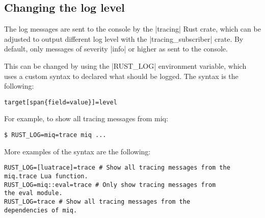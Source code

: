 \subsection{Changing the log level}

The log messages are sent to the console by the |tracing|
Rust crate, which can be adjusted to output different log
level with the |tracing_subscriber| crate. By default, only messages of severity |info| or
higher as sent to the console.

This can be changed by using the |RUST_LOG| environment
variable, which uses a custom syntax to declared what should
be logged. The syntax is the following:

\begin{verbatim}
target[span{field=value}]=level
\end{verbatim}

For example, to show all tracing messages from miq:

\begin{verbatim}
$ RUST_LOG=miq=trace miq ...
\end{verbatim}

More examples of the syntax are the following:

\begin{verbatim}
RUST_LOG=[luatrace]=trace # Show all tracing messages from the miq.trace Lua function.
RUST_LOG=miq::eval=trace # Only show tracing messages from
the eval module.
RUST_LOG=trace # Show all tracing messages from the
dependencies of miq.
\end{verbatim}

